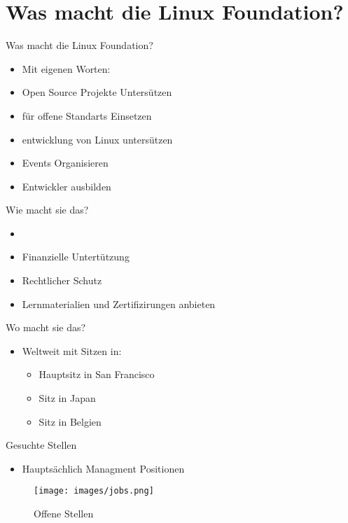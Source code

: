 \documentclass[11pt,aspectratio=169]{beamer}
\begin{document}
\section{Was macht die Linux Foundation?}

\begin{frame}{Was macht die Linux Foundation?}
	\begin{itemize}
		\item<1-> Mit eigenen Worten:\cite{About}
		\item<2-> Open Source Projekte Untersützen
		\item<3-> für offene Standarts Einsetzen
		\item <4->entwicklung von Linux untersützen
		\item<5-> Events Organisieren\cite{Events}
		\item<6-> Entwickler ausbilden\cite{Training}
	\end{itemize}

\end{frame}

\begin{frame}{Wie macht sie das?}
	\begin{itemize}
		\item <1->\cite{Grundprinziepe}
		\item <2->Finanzielle Untertützung
		\item <3->Rechtlicher Schutz
		\item <4->Lernmaterialien und Zertifizirungen anbieten\cite{Training}
	\end{itemize}
\end{frame}
\begin{frame}{Wo macht sie das?}
	\begin{itemize}
		\item Weltweit mit Sitzen in:
		      \begin{itemize}
			      \item Hauptsitz in San Francisco \cite{Locations}
			      \item Sitz in Japan\cite{Locations}
			      \item Sitz in Belgien\cite{Locations}
		      \end{itemize}
	\end{itemize}
\end{frame}
\begin{frame}{Gesuchte Stellen}
	\begin{itemize}

		\item	Hauptsächlich Managment Positionen
	\end{itemize}
	\begin{figure}
		\centering
		\texttt{[image: images/jobs.png]}\cite{Positionen}
		\caption{Offene Stellen}
	\end{figure}

\end{frame}
\end{document}

